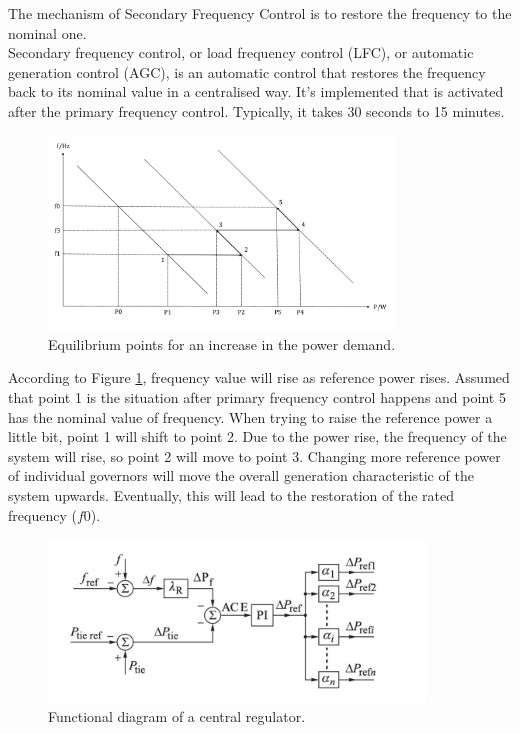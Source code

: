 \documentclass{report}
\begin{document}
The mechanism of Secondary Frequency Control is to restore the frequency to the nominal one.\\

Secondary frequency control, or load frequency control (LFC), or automatic generation control (AGC), is an automatic control that restores the frequency back to its nominal value in a centralised way. It's implemented that is activated after the primary frequency control. Typically, it takes 30 seconds to 15 minutes.\\

\begin{figure}[htbp]
\centering
\includegraphics[width = 0.816\textwidth]{figure/3_1_Equilibrium.pdf}
\caption{Equilibrium points for an increase in the power demand.}
\label{3_1_Equilibrium}
\end{figure}

According to Figure \textcolor{red}{\ref{3_1_Equilibrium}}, frequency value will rise as reference power rises. Assumed that point 1 is the situation after primary frequency control happens and point 5 has the nominal value of frequency. When trying to raise the reference power a little bit, point 1 will shift to point 2. Due to the power rise, the frequency of the system will rise, so point 2 will move to point 3. Changing more reference power of individual governors will move the overall generation characteristic of the system upwards. Eventually, this will lead to the restoration of the rated frequency ($f0$).\\

\begin{figure}[htb]
\centering
\includegraphics[width = 0.891\textwidth]{figure/3_1_Functional.png}
\caption{Functional diagram of a central regulator.}
\label{3_1_Functional}
\end{figure}
\end{document}
